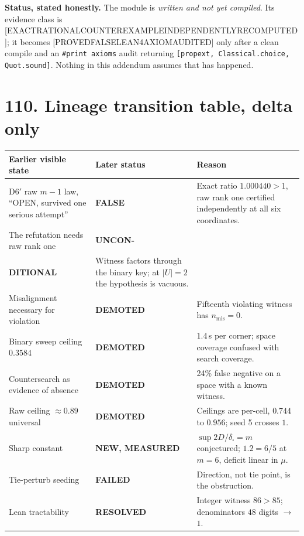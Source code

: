 \documentclass[9pt,twocolumn]{article}
\newcommand{\eclass}[1]{\textsf{[#1]}}
\renewcommand{\_}{\CIGunderscore\allowbreak}
\begin{document}
\textbf{Status, stated honestly.} The module is \emph{written and not yet compiled}. Its evidence class is \eclass{EXACT\_RATIONAL\_COUNTEREXAMPLE\_INDEPENDENTLY\_RECOMPUTED}; it becomes \eclass{PROVED\_FALSE\_LEAN4\_AXIOM\_AUDITED} only after a clean compile and an \texttt{\#print axioms} audit returning \texttt{[propext, Classical.choice, Quot.sound]}. Nothing in this addendum assumes that has happened.

\section*{110. Lineage transition table, delta only}
\begin{center}\scriptsize
\begin{tabularx}{0.98\columnwidth}{>{\raggedright\arraybackslash}p{}>{\raggedright\arraybackslash}p{}X}
\toprule
Earlier visible state & Later status & Reason\\
\midrule
D6$'$ raw $m-1$ law, ``OPEN, survived one serious attempt'' & \textbf{FALSE} & Exact ratio $1.000440>1$, raw rank one certified independently at all six coordinates.\\
The refutation needs raw rank one & \textbf{UNCON-}\\ \textbf{DITIONAL} & Witness factors through the binary key; at $|U|=2$ the hypothesis is vacuous.\\
Misalignment necessary for violation & \textbf{DEMOTED} & Fifteenth violating witness has $n_{\mathrm{mis}}=0$.\\
Binary sweep ceiling $0.3584$ & \textbf{DEMOTED} & $1.4$\,s per corner; space coverage confused with search coverage.\\
Countersearch as evidence of absence & \textbf{DEMOTED} & 24\% false negative on a space with a known witness.\\
Raw ceiling $\approx0.89$ universal & \textbf{DEMOTED} & Ceilings are per-cell, $0.744$ to $0.956$; seed 5 crosses $1$.\\
Sharp constant & \textbf{NEW, MEASURED} & $\sup 2D/\delta_\square=m$ conjectured; $1.2=6/5$ at $m=6$, deficit linear in $\mu$.\\
Tie-perturb seeding & \textbf{FAILED} & Direction, not tie point, is the obstruction.\\
Lean tractability & \textbf{RESOLVED} & Integer witness $86>85$; denominators $48$ digits $\to$ $1$.\\
\bottomrule
\end{tabularx}
\end{center}
\end{document}
